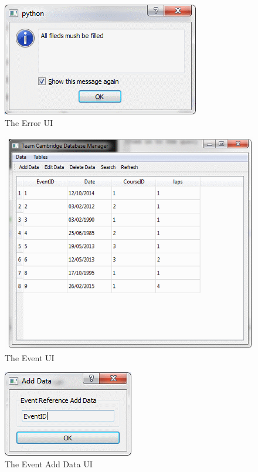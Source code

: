 \begin{figure}
\includegraphics[width=\textwidth]{./Maintenance/UI/Error.png}
\caption{The Error UI} \label{fig:Error_UI}
\end{figure}

\begin{figure}
\includegraphics[width=\textwidth]{./Maintenance/UI/Event.png}
\caption{The Event UI} \label{fig:Event_UI}
\end{figure}

\begin{figure}
\includegraphics[width=\textwidth]{./Maintenance/UI/EventAD.png}
\caption{The Event Add Data UI} \label{fig:EventAD_UI}
\end{figure}

